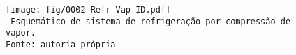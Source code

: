     \begin{frame}\vspace*{-0em}
        \begin{center}
            \begin{figure}
                \fontsize{5.0}{5}\selectfont
                \texttt{[image: fig/0002-Refr-Vap-ID.pdf]}
                \\\vspace*{-0.0em}\texttt{%
                    Esquemático de sistema de refrigeração por compressão de vapor.\\
                    Fonte: autoria própria
                }
            \end{figure}
        \end{center}
    \end{frame}
    \begin{frame}\vspace*{-0em}
    \end{frame}
    \begin{frame}\vspace*{-0em}
    \end{frame}
    \begin{frame}\vspace*{-0em}
    \end{frame}
    \begin{frame}\vspace*{-0em}
    \end{frame}
    \begin{frame}\vspace*{-0em}
    \end{frame}
    \begin{frame}\vspace*{-0em}
    \end{frame}

